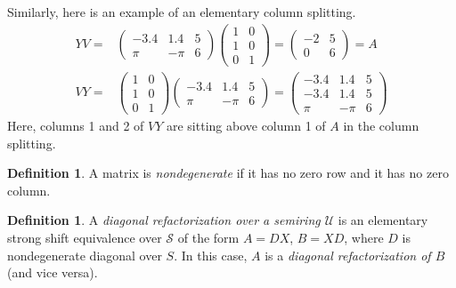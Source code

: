 \documentclass{amsart}
\theoremstyle{definition}
\newtheorem{definition}[theorem]{Definition}
\theoremstyle{remark}
\numberwithin{equation}{section}
\begin{document}
Similarly, here is an example of an elementary column splitting. 
\begin{align*} 
YV= & 
\begin{pmatrix} 
-3.4&1.4&5 \\
\pi & -\pi &6
\end{pmatrix} 
\begin{pmatrix} 
1&0\\1&0\\0&1 
\end{pmatrix} 
= 
\begin{pmatrix} 
-2& 5 \\ 
0 & 6 
\end{pmatrix} 
= A \\ 
VY = & 
\begin{pmatrix} 
1&0\\1&0\\0&1 
\end{pmatrix} 
\begin{pmatrix} 
-3.4&1.4&5 \\
\pi & -\pi &6
\end{pmatrix} 
= 
\begin{pmatrix} 
-3.4&1.4&5 \\
-3.4&1.4&5 \\
\pi & -\pi &6
\end{pmatrix} 
\end{align*}
Here, columns 1 and 2 of $VY$ are sitting above column 1 of $A$ in 
the column splitting. 

\begin{definition} 
A matrix is {\it nondegenerate } if it has no zero row and 
it has no zero column. 
\end{definition} 

\begin{definition}  A {\it diagonal refactorization over a semiring $\mathcal U$}
 is an elementary 
strong shift equivalence over $\mathcal S$ of the form $A=DX$, $B=XD$, 
where $D$ is nondegenerate 
diagonal over $S$. In this case, $A$ is a 
{\it diagonal refactorization of $B$} 
(and vice versa). 
\end{definition} 
\end{document}
